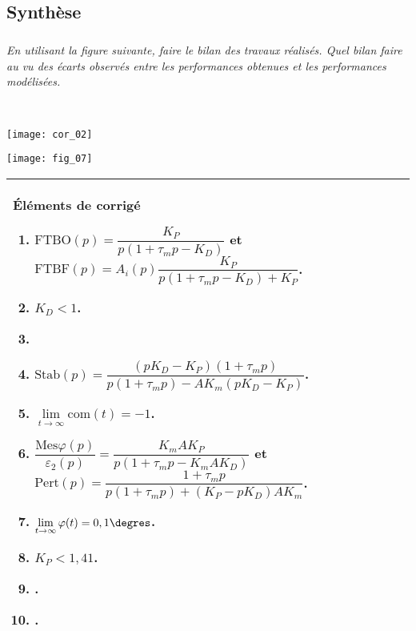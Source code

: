 \begin{multicols}{2}
\subsection*{Synthèse}
\subparagraph{}
\textit{En utilisant la figure suivante, faire le bilan des travaux réalisés. Quel bilan faire au vu des écarts observés entre les performances obtenues et les performances modélisées. }
\ifprof
\begin{corrige}~\\
\begin{center}
\texttt{[image: cor\_02]}
\end{center}
\end{corrige}
\else
\begin{center}
\texttt{[image: fig\_07]}
\end{center}
\fi

\ifcolle
\else
\ifprof
\else
\footnotesize
\noindent\begin{tabular}{|p{.95\linewidth}|}
\hline
Éléments de corrigé
\begin{enumerate}
\item $\text{FTBO}(p)=\dfrac{ K_P}{p\left(1+\tau_m p-K_D \right)}$ et $\text{FTBF}(p)=A_i(p)\dfrac{K_P}{p\left(1+\tau_m p- K_D \right)+K_P}$.
\item $K_D < 1$.
\item 
\item $\text{Stab}(p)=\dfrac{\left(pK_D-K_P \right) \left(1+\tau_m p\right)}{p\left(1+\tau_m p \right) - AK_m \left( pK_D-K_P\right) }$.
\item $\lim\limits_{t\to\infty}\text{com}(t)=-1$.
\item $\dfrac{\text{Mes}\varphi(p)}{\varepsilon_2(p)} = \dfrac{K_m A K_P}{p\left(1+\tau_m p-K_m A K_D \right)}$  et $\text{Pert}(p)=\dfrac{1+\tau_m p}{p \left(1+\tau_m p\right)+\left(K_P-pK_D\right)AK_m}$.
\item $\lim\limits_{t\to\infty}\varphi(t) = 0,1\degres$.
\item $K_P < 1,41 $.
\item .
\item .
\end{enumerate}\\
\hline
\end{tabular}
\normalsize
\fi
\fi


\ifprof
\else
\end{multicols}
\fi


%
%
%
%
%
%
